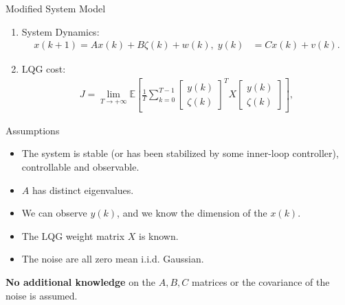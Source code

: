 \documentclass[10pt]{beamer}
\begin{document}
\begin{frame}{Modified System Model}
  \begin{figure}
    \centering
  \end{figure}
  \begin{enumerate}
  \item System Dynamics:
  \begin{align*}
    x(k+1) = A x(k) + B\zeta(k)+w(k), \;y(k)  &= C x(k) + v(k) . 
  \end{align*}
  \item LQG cost:
	\begin{align*}
		J = \lim_{T \to +\infty} \mathbb E\left [\frac{1}{T}\sum_{k=0}^{T-1} \begin{bmatrix}
		y(k)\\
		\zeta(k)
		\end{bmatrix}^TX \begin{bmatrix}
		y(k)\\
		\zeta(k)
		\end{bmatrix} \right ],
	\end{align*}
  \end{enumerate}
\end{frame}

\begin{frame}{Assumptions}
  \begin{itemize}
  \item The system is stable (or has been stabilized by some inner-loop controller), controllable and observable.
  \item $A$ has distinct eigenvalues.
  \item We can observe $y(k)$, and we know the dimension of the $x(k)$.
  \item The LQG weight matrix $X$ is known.
  \item The noise are all zero mean i.i.d. Gaussian.
  \end{itemize}
  \textbf{No additional knowledge} on the $A,B,C$ matrices or the covariance of the noise is assumed.
\end{frame}
\end{document}
